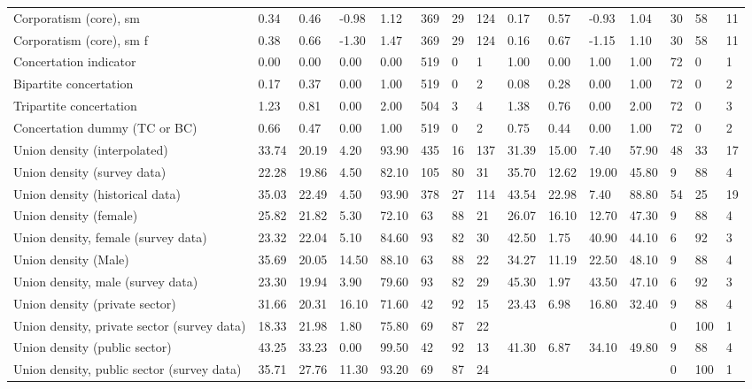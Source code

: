 \begin{longtable}{lllllllllllllll}
\addlinespace
Corporatism (core), sm & 0.34 & 0.46 & -0.98 & 1.12 & 369 & 29 & 124 & 0.17 & 0.57 & -0.93 & 1.04 & 30 & 58 & 11\\
Corporatism (core), sm f & 0.38 & 0.66 & -1.30 & 1.47 & 369 & 29 & 124 & 0.16 & 0.67 & -1.15 & 1.10 & 30 & 58 & 11\\
Concertation indicator & 0.00 & 0.00 & 0.00 & 0.00 & 519 & 0 & 1 & 1.00 & 0.00 & 1.00 & 1.00 & 72 & 0 & 1\\
Bipartite concertation & 0.17 & 0.37 & 0.00 & 1.00 & 519 & 0 & 2 & 0.08 & 0.28 & 0.00 & 1.00 & 72 & 0 & 2\\
Tripartite concertation & 1.23 & 0.81 & 0.00 & 2.00 & 504 & 3 & 4 & 1.38 & 0.76 & 0.00 & 2.00 & 72 & 0 & 3\\
\addlinespace
Concertation dummy (TC or BC) & 0.66 & 0.47 & 0.00 & 1.00 & 519 & 0 & 2 & 0.75 & 0.44 & 0.00 & 1.00 & 72 & 0 & 2\\
Union density (interpolated) & 33.74 & 20.19 & 4.20 & 93.90 & 435 & 16 & 137 & 31.39 & 15.00 & 7.40 & 57.90 & 48 & 33 & 17\\
Union density (survey data) & 22.28 & 19.86 & 4.50 & 82.10 & 105 & 80 & 31 & 35.70 & 12.62 & 19.00 & 45.80 & 9 & 88 & 4\\
Union density (historical data) & 35.03 & 22.49 & 4.50 & 93.90 & 378 & 27 & 114 & 43.54 & 22.98 & 7.40 & 88.80 & 54 & 25 & 19\\
Union density (female) & 25.82 & 21.82 & 5.30 & 72.10 & 63 & 88 & 21 & 26.07 & 16.10 & 12.70 & 47.30 & 9 & 88 & 4\\
\addlinespace
Union density, female (survey data) & 23.32 & 22.04 & 5.10 & 84.60 & 93 & 82 & 30 & 42.50 & 1.75 & 40.90 & 44.10 & 6 & 92 & 3\\
Union density (Male) & 35.69 & 20.05 & 14.50 & 88.10 & 63 & 88 & 22 & 34.27 & 11.19 & 22.50 & 48.10 & 9 & 88 & 4\\
Union density, male (survey data) & 23.30 & 19.94 & 3.90 & 79.60 & 93 & 82 & 29 & 45.30 & 1.97 & 43.50 & 47.10 & 6 & 92 & 3\\
Union density (private sector) & 31.66 & 20.31 & 16.10 & 71.60 & 42 & 92 & 15 & 23.43 & 6.98 & 16.80 & 32.40 & 9 & 88 & 4\\
Union density, private sector (survey data) & 18.33 & 21.98 & 1.80 & 75.80 & 69 & 87 & 22 &  &  &  &  & 0 & 100 & 1\\
\addlinespace
Union density (public sector) & 43.25 & 33.23 & 0.00 & 99.50 & 42 & 92 & 13 & 41.30 & 6.87 & 34.10 & 49.80 & 9 & 88 & 4\\
Union density, public sector (survey data) & 35.71 & 27.76 & 11.30 & 93.20 & 69 & 87 & 24 &  &  &  &  & 0 & 100 & 1\\

\end{longtable}
